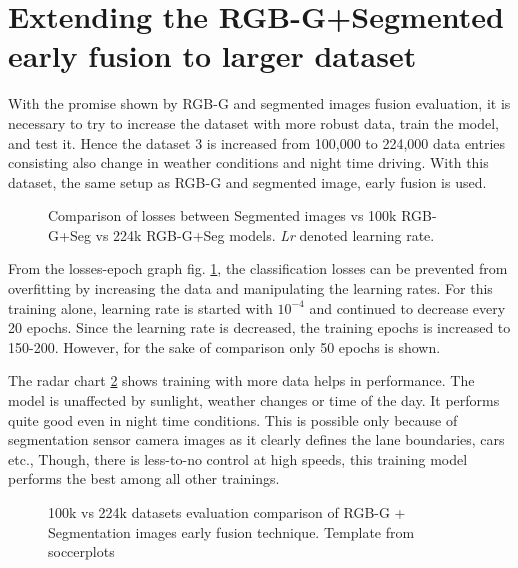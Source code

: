 \section{Extending the RGB-G+Segmented early fusion to larger dataset}
With the promise shown by RGB-G and segmented images fusion evaluation, it is necessary to
try to increase the dataset with more robust data, train the model, and test it. Hence the
dataset 3 is increased from 100,000 to 224,000 data entries consisting also change in
weather conditions and night time driving. With this dataset, the same setup as RGB-G and
segmented image, early fusion is used.
\begin{figure}[!ht]
    \centering
    \def\svgwidth{\textwidth}
    
    \caption{Comparison of losses between Segmented images vs 100k RGB-G+Seg vs 224k
    RGB-G+Seg models. \textit{Lr} denoted learning rate.}
    \label{fig:224kdatafusionlosses2}
\end{figure}
From the losses-epoch graph fig. \ref{fig:224kdatafusionlosses2}, the classification
losses can be prevented from overfitting by increasing the data and manipulating the
learning rates. For this training alone, learning rate is started with $10^{-4}$ and
continued to decrease every 20 epochs. Since the learning rate is decreased, the training
epochs is increased to 150-200. However, for the sake of comparison only 50 epochs is
shown.

The radar chart \ref{fig:radar100kvs224k} shows training with more data helps in
performance. The model is unaffected by sunlight, weather changes or time of the day. It
performs quite good even in night time conditions. This is possible only because of
segmentation sensor camera images as it clearly defines the lane boundaries, cars etc.,
Though, there is less-to-no control at high speeds, this training model performs the best
among all other trainings.

\begin{figure}[!ht]
    \centering
    \def\svgwidth{0.8\textwidth}
    
    \caption{100k vs 224k datasets evaluation comparison of RGB-G + Segmentation images
    early fusion technique. Template from soccerplots\cite{soccerplots}}
    \label{fig:radar100kvs224k}
\end{figure}
